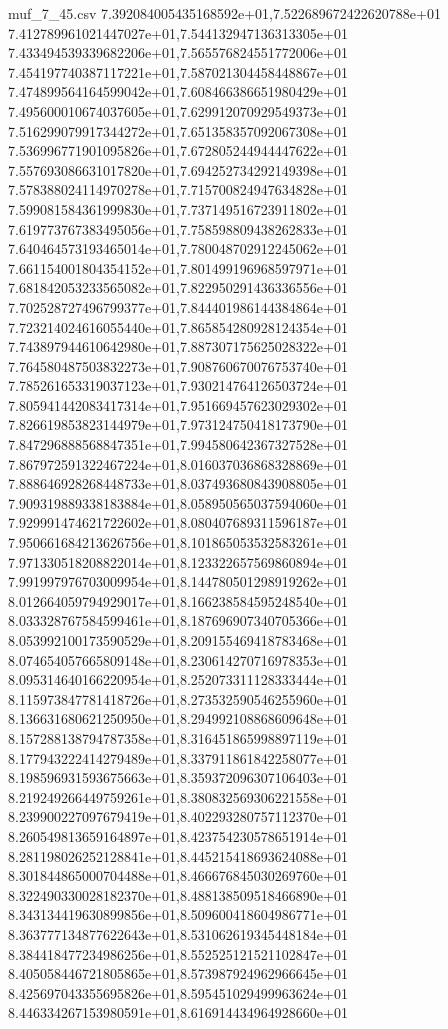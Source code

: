 \begin{filecontents*}{muf_7_45.csv}
7.392084005435168592e+01,7.522689672422620788e+01
7.412789961021447027e+01,7.544132947136313305e+01
7.433494539339682206e+01,7.565576824551772006e+01
7.454197740387117221e+01,7.587021304458448867e+01
7.474899564164599042e+01,7.608466386651980429e+01
7.495600010674037605e+01,7.629912070929549373e+01
7.516299079917344272e+01,7.651358357092067308e+01
7.536996771901095826e+01,7.672805244944447622e+01
7.557693086631017820e+01,7.694252734292149398e+01
7.578388024114970278e+01,7.715700824947634828e+01
7.599081584361999830e+01,7.737149516723911802e+01
7.619773767383495056e+01,7.758598809438262833e+01
7.640464573193465014e+01,7.780048702912245062e+01
7.661154001804354152e+01,7.801499196968597971e+01
7.681842053233565082e+01,7.822950291436336556e+01
7.702528727496799377e+01,7.844401986144384864e+01
7.723214024616055440e+01,7.865854280928124354e+01
7.743897944610642980e+01,7.887307175625028322e+01
7.764580487503832273e+01,7.908760670076753740e+01
7.785261653319037123e+01,7.930214764126503724e+01
7.805941442083417314e+01,7.951669457623029302e+01
7.826619853823144979e+01,7.973124750418173790e+01
7.847296888568847351e+01,7.994580642367327528e+01
7.867972591322467224e+01,8.016037036868328869e+01
7.888646928268448733e+01,8.037493680843908805e+01
7.909319889338183884e+01,8.058950565037594060e+01
7.929991474621722602e+01,8.080407689311596187e+01
7.950661684213626756e+01,8.101865053532583261e+01
7.971330518208822014e+01,8.123322657569860894e+01
7.991997976703009954e+01,8.144780501298919262e+01
8.012664059794929017e+01,8.166238584595248540e+01
8.033328767584599461e+01,8.187696907340705366e+01
8.053992100173590529e+01,8.209155469418783468e+01
8.074654057665809148e+01,8.230614270716978353e+01
8.095314640166220954e+01,8.252073311128333444e+01
8.115973847781418726e+01,8.273532590546255960e+01
8.136631680621250950e+01,8.294992108868609648e+01
8.157288138794787358e+01,8.316451865998897119e+01
8.177943222414279489e+01,8.337911861842258077e+01
8.198596931593675663e+01,8.359372096307106403e+01
8.219249266449759261e+01,8.380832569306221558e+01
8.239900227097679419e+01,8.402293280757112370e+01
8.260549813659164897e+01,8.423754230578651914e+01
8.281198026252128841e+01,8.445215418693624088e+01
8.301844865000704488e+01,8.466676845030269760e+01
8.322490330028182370e+01,8.488138509518466890e+01
8.343134419630899856e+01,8.509600418604986771e+01
8.363777134877622643e+01,8.531062619345448184e+01
8.384418477234986256e+01,8.552525121521102847e+01
8.405058446721805865e+01,8.573987924962966645e+01
8.425697043355695826e+01,8.595451029499963624e+01
8.446334267153980591e+01,8.616914434964928660e+01

\end{filecontents*}
